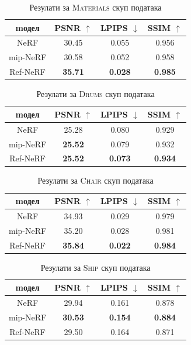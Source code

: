 \documentclass[12pt, a4paper, twoside]{book}
\numberwithin{equation}{chapter}
\numberwithin{theorem}{section}
\numberwithin{definition}{section}
\numberwithin{definitionChapter}{chapter}
\begin{document}
	\begin{table}[H]
		\centering
		\begin{tabular}{cccc} \toprule
			{mодел}			& {PSNR $\uparrow$} & {LPIPS $\downarrow$}	& {SSIM $\uparrow$} \\ \midrule
			{NeRF} 			& 30.45 			& 0.055					& 0.956 \\ 
			{mip-NeRF}		& 30.58 			& 0.052					& 0.958 \\
			{Ref-NeRF}		& \textbf{35.71}	& \textbf{0.028}		& \textbf{0.985} \\ \bottomrule
		\end{tabular}
		\caption{Резулати за \textsc{Materials} скуп података}
		\label{table-materials}
	\end{table}

	\begin{table}[H]
		\centering
		\begin{tabular}{cccc} \toprule
			{mодел}			& {PSNR $\uparrow$} & {LPIPS $\downarrow$}	& {SSIM $\uparrow$} \\ \midrule
			{NeRF}			& 25.28				& 0.080 				& 0.929 \\ 
			{mip-NeRF}		& \textbf{25.52}	& 0.079					& 0.932 \\
			{Ref-NeRF}		& \textbf{25.52}	& \textbf{0.073}		& \textbf{0.934} \\ \bottomrule
		\end{tabular}
		\caption{Резулати за \textsc{Drums} скуп података}
		\label{table-drums}
	\end{table}

	\begin{table}[H]
		\centering
		\begin{tabular}{cccc} \toprule
			{mодел} 		& {PSNR $\uparrow$} & {LPIPS $\downarrow$}	& {SSIM $\uparrow$} \\ \midrule
			{NeRF} 			& 34.93				& 0.029					& 0.979 \\ 
			{mip-NeRF} 		& 35.20				& 0.028					& 0.981 \\
			{Ref-NeRF}		& \textbf{35.84}	& \textbf{0.022}		& \textbf{0.984} \\ \bottomrule
		\end{tabular}
		\caption{Резулати за \textsc{Chair} скуп података}
		\label{table-chair}
	\end{table}

	\begin{table}[H]
		\centering
		\begin{tabular}{cccc} \toprule
			{mодел}			& {PSNR $\uparrow$} & {LPIPS $\downarrow$}	& {SSIM $\uparrow$} \\ \midrule
			{NeRF}			& 29.94				& 0.161					& 0.878 \\ 
			{mip-NeRF}		& \textbf{30.53} 	& \textbf{0.154}		& \textbf{0.884} \\
			{Ref-NeRF}		& 29.50				& 0.164					& 0.871 \\ \bottomrule
		\end{tabular}
		\caption{Резулати за \textsc{Ship} скуп података}
		\label{table-ship}
	\end{table}
\end{document}
